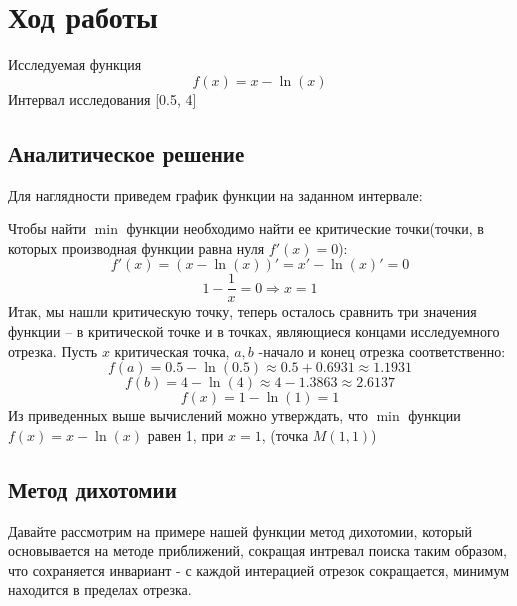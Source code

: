 \documentclass[a4paper, 14pt]{article}
\begin{document}
	\section*{Ход работы}
	Исследуемая функция \[f(x) = x -   \ln(x)\] Интервал исследования [0.5, 4]
	\subsection*{ Аналитическое решение}
	Для наглядности приведем график функции на заданном интервале:


	Чтобы найти $\min$ функции необходимо найти ее критические точки(точки, в которых производная функции равна нуля $f'(x) = 0$):
	\[f'(x) = (x - \ln(x))' = x' - \ln(x)' = 0\]
	\[1 - \frac{1}{x} = 0 \Rightarrow x = 1\]
	Итак, мы нашли критическую точку, теперь осталось сравнить три значения функции -- в критической точке и в точках, являющиеся концами исследуемного отрезка. Пусть $x$ критическая точка, $a, b$ -начало и конец отрезка соответственно:
	\[f(a) = 0.5 - \ln(0.5) \approx 0.5 + 0.6931  \approx 1.1931\]
	\[f(b) = 4 - \ln(4) \approx 4 - 1.3863 \approx 2.6137\]
	\[f(x) = 1 - \ln(1) = 1\]
	Из приведенных выше вычислений можно утверждать, что $\min$ функции $f(x) = x - \ln(x)$ равен 1, при $x =1$, (точка $M(1,1)$)
	\subsection*{Метод дихотомии}
	Давайте рассмотрим на примере нашей функции метод дихотомии, который основывается на методе приближений, сокращая интревал поиска таким образом, что сохраняется инвариант - с каждой интерацией отрезок сокращается, минимум находится в пределах отрезка.
\end{document}
